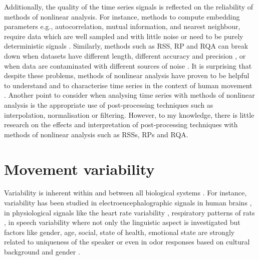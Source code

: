 Additionally, the quality of the time series signals is reflected on 
the reliability of methods of nonlinear analysis. For instance, 
methods to compute embedding 
parameters e.g., autocorrelation, mutual information, and nearest neighbour,
require data which are well sampled and with little noise \citep{garland2016} 
or need to be purely deterministic signals \citep{kantz2003}.
Similarly, methods such as RSS, RP and RQA can break down when 
datasets have different length, different accuracy and 
precision \citep{frank2010},
or when data are contaminated with different sources of noise 
\citep{garland2016}. It is surprising that despite these problems,
methods of nonlinear analysis have proven to be helpful 
to understand and to characterise time series in 
the context of human movement 
\citep{Quintana-Duque2012, Quintana-Duque2016, sama2013, frank2010,
gomezgarcia2014, marwan2011, stergiou2011, bradley2015}.
Another point to consider when analysing time series 
with methods of nonlinear analysis is the appropriate 
use of post-processing techniques 
such as interpolation, normalisation or filtering.
However, to my knowledge, there is little research on the 
effects and interpretation of post-processing techniques 
with methods of nonlinear analysis such as RSSs, RPs and  RQA.

\section{Movement variability}
Variability is inherent within and between all biological 
systems \citep{newell1993}.
For instance, variability has been studied in electroencephalographic 
signals in human brains \citep{klonowski2007}, in physiological signals 
like the heart rate variability \citep{schumacher2004, acharya2006}, 
respiratory patterns of rats \citep{dhingra2011}, in speech variability 
where not only the linguistic aspect is investigated but 
factors like gender, age, social, state of health, emotional state are
strongly related to uniqueness of the speaker \citep{benzeghiba2007}
or even in odor responses based on cultural background and 
gender \citep{ferdenzi2013}.

